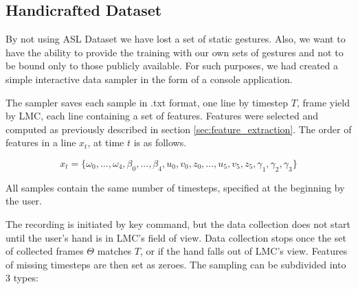 \subsection{Handicrafted Dataset}

By not using ASL Dataset we have lost a set of static gestures. Also, we want to have the ability to provide the training with our own sets of gestures and not to be bound only to those publicly available. For such purposes, we had created a simple interactive data sampler in the form of a console application.

The sampler saves each sample in .txt format, one line by timestep $T$, frame yield by LMC, each line containing a set of features. Features were selected and computed as previously described in section \ref{sec:feature_extraction}. The order of features in a line $x_t$, at time $t$ is as follows.


\begin{equation}
	{x_t = \{\omega_0, ...,\omega_4, \beta_0, ..., \beta_4, u_0,v_0,z_0, ..., u_5,v_5,z_5, \gamma_1, \gamma_2, \gamma_3\}}
\end{equation}



All samples contain the same number of timesteps, specified at the beginning by the user. 

The recording is initiated by key command, but the data collection does not start until the user's hand is in LMC's field of view. Data collection stops once the set of collected frames $\Theta$ matches $T$, or if the hand falls out of LMC's view. Features of missing timesteps are then set as zeroes. The sampling can be subdivided into 3 types:

